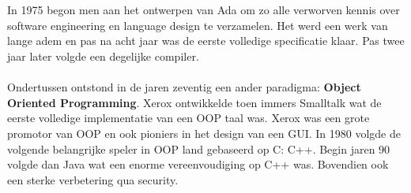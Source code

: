 \documentclass[../main.tex]{subfiles}
\begin{document}
\begin{solution}
\\\\
In 1975 begon men aan het ontwerpen van Ada om zo alle verworven kennis over software engineering en language design te verzamelen.
Het werd een werk van lange adem en pas na acht jaar was de eerste volledige specificatie klaar.
Pas twee jaar later volgde een degelijke compiler.
\\\\
Ondertussen ontstond in de jaren zeventig een ander paradigma: \textbf{Object Oriented Programming}.
Xerox ontwikkelde toen immers Smalltalk wat de eerste volledige implementatie van een OOP taal was.
Xerox was een grote promotor van OOP en ook pioniers in het design van een GUI.
In 1980 volgde de volgende belangrijke speler in OOP land gebaseerd op C: C++.
Begin jaren 90 volgde dan Java wat een enorme vereenvoudiging op C++ was.
Bovendien ook een sterke verbetering qua security.
\end{solution}
\end{document}
